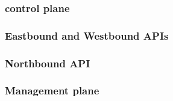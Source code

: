 \subsubsection{control plane} %


\subsubsection{Eastbound and Westbound APIs} %


\subsubsection{Northbound API} %


\subsubsection{Management plane} %
        




